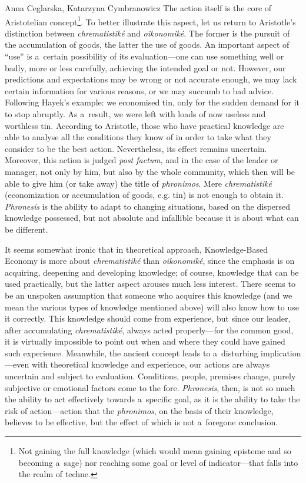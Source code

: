 \begin{artengenv2auth}{Anna Ceglarska, Katarzyna Cymbranowicz}
The action itself is the core of Aristotelian concept\footnote{Not gaining the full knowledge (which would mean gaining episteme and so becoming a~sage) nor reaching some goal or level of indicator---that falls into the realm of techne.}. To better illustrate this aspect, let us return to Aristotle's distinction between \textit{chrematistiké} and \textit{oikonomiké}. The former is the pursuit of the accumulation of goods, the latter the use of goods. An important aspect of ``use'' is a~certain possibility of its evaluation---one can use something well or badly, more or less carefully, achieving the intended goal or not. However, our predictions and expectations may be wrong or not accurate enough, we may lack certain information for various reasons, or we may succumb to bad advice. Following Hayek's example: we economised tin, only for the sudden demand for it to stop abruptly. As a~result, we were left with loads of now useless and worthless tin. According to Aristotle, those who have practical knowledge are able to analyse all the conditions they know of in order to take what they consider to be the best action. Nevertheless, its effect remains uncertain. Moreover, this action is judged \textit{post factum}, and in the case of the leader or manager, not only by him, but also by the whole community, which then will be able to give him (or take away) the title of \textit{phronimos}. Mere \textit{chrematistiké} (economization or accumulation of goods, e.g. tin) is not enough to obtain it. \textit{Phronesis} is the ability to adapt to changing situations, based on the dispersed knowledge possessed, but not absolute and infallible because it is about what can be different.



It seems somewhat ironic that in theoretical approach, Knowledge-Based Economy is more about \textit{chrematistiké} than \textit{oikonomiké}, since the emphasis is on acquiring, deepening and developing knowledge; of course, knowledge that can be used practically, but the latter aspect arouses much less interest. There seems to be an unspoken assumption that someone who acquires this knowledge (and we mean the various types of knowledge mentioned above) will also know how to use it correctly. This knowledge should come from experience, but since our leader, after accumulating \textit{chrematistiké}, always acted properly---for the common good, it is virtually impossible to point out when and where they could have gained such experience. Meanwhile, the ancient concept leads to a~disturbing implication---even with theoretical knowledge and experience, our actions are always uncertain and subject to evaluation. Conditions, people, premises change, purely subjective or emotional factors come to the fore. \textit{Phronesis}, then, is not so much the ability to act effectively towards a~specific goal, as it is the ability to take the risk of action---action that the \textit{phronimos}, on the basis of their knowledge, believes to be effective, but the effect of which is not a~foregone conclusion.




\end{artengenv2auth}
